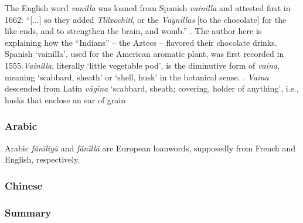 The English word \textit{vanilla} was loaned from Spanish \textit{vainilla} and attested first in 1662: ``[...] so they added \textit{Tlilxochitl}, or the \textit{Vaynillas} [to the chocolate] for the like ends, and to strengthen the brain, and womb.'' \autocite[11]{stubbe_indian_1662}. The author here is explaining how the ``Indians'' -- the Aztecs -- flavored their chocolate drinks. Spanish `vainilla', used for the American aromatic plant,  was first recorded in 1555.\textit{Vainilla}, literally `little vegetable pod', is the diminutive form of \textit{vaina}, meaning `scabbard, sheath' or `shell, husk' in the botanical sense.  \autocites[596]{corominas_breve_1987}[538]{gomez_de_silva_elseviers_1985}. \textit{Vaina} descended from Latin \textit{vāgīna} `scabbard, sheath; covering, holder of anything', i.e., husks that enclose an ear of grain 



\subsubsection{Arabic}



Arabic \textit{fānīliyā} and \textit{fānīllā} are European loanwords, supposedly from French and English, respectively.




\subsubsection{Chinese}





\subsubsection{Summary}


















